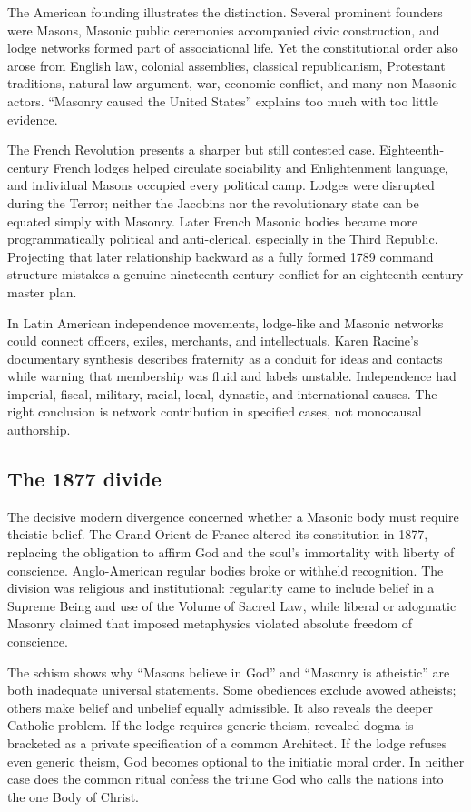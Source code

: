 The American founding illustrates the distinction. Several prominent founders were Masons, Masonic public ceremonies accompanied civic construction, and lodge networks formed part of associational life. Yet the constitutional order also arose from English law, colonial assemblies, classical republicanism, Protestant traditions, natural-law argument, war, economic conflict, and many non-Masonic actors. “Masonry caused the United States” explains too much with too little evidence.

The French Revolution presents a sharper but still contested case. Eighteenth-century French lodges helped circulate sociability and Enlightenment language, and individual Masons occupied every political camp. Lodges were disrupted during the Terror; neither the Jacobins nor the revolutionary state can be equated simply with Masonry. Later French Masonic bodies became more programmatically political and anti-clerical, especially in the Third Republic. Projecting that later relationship backward as a fully formed 1789 command structure mistakes a genuine nineteenth-century conflict for an eighteenth-century master plan.

In Latin American independence movements, lodge-like and Masonic networks could connect officers, exiles, merchants, and intellectuals. Karen Racine's documentary synthesis describes fraternity as a conduit for ideas and contacts while warning that membership was fluid and labels unstable. Independence had imperial, fiscal, military, racial, local, dynastic, and international causes. The right conclusion is network contribution in specified cases, not monocausal authorship.

\subsection{The 1877 divide}

The decisive modern divergence concerned whether a Masonic body must require theistic belief. The Grand Orient de France altered its constitution in 1877, replacing the obligation to affirm God and the soul's immortality with liberty of conscience. Anglo-American regular bodies broke or withheld recognition. The division was religious and institutional: regularity came to include belief in a Supreme Being and use of the Volume of Sacred Law, while liberal or adogmatic Masonry claimed that imposed metaphysics violated absolute freedom of conscience.

The schism shows why “Masons believe in God” and “Masonry is atheistic” are both inadequate universal statements. Some obediences exclude avowed atheists; others make belief and unbelief equally admissible. It also reveals the deeper Catholic problem. If the lodge requires generic theism, revealed dogma is bracketed as a private specification of a common Architect. If the lodge refuses even generic theism, God becomes optional to the initiatic moral order. In neither case does the common ritual confess the triune God who calls the nations into the one Body of Christ.

